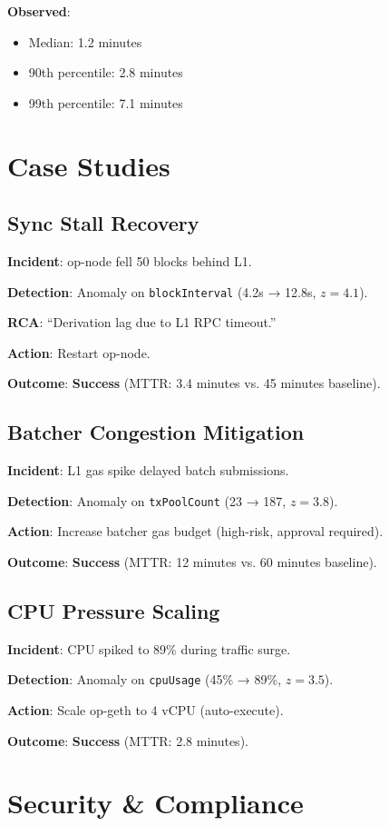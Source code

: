 \documentclass[11pt,a4paper]{article}
\begin{document}
\textbf{Observed}:
\begin{itemize}
    \item Median: 1.2 minutes
    \item 90th percentile: 2.8 minutes
    \item 99th percentile: 7.1 minutes
\end{itemize}

\section{Case Studies}

\subsection{Sync Stall Recovery}
\textbf{Incident}: op-node fell 50 blocks behind L1.

\textbf{Detection}: Anomaly on \texttt{blockInterval} (4.2s → 12.8s, $z=4.1$).

\textbf{RCA}: ``Derivation lag due to L1 RPC timeout.''

\textbf{Action}: Restart op-node.

\textbf{Outcome}: \textbf{Success} (MTTR: 3.4 minutes vs. 45 minutes baseline).

\subsection{Batcher Congestion Mitigation}
\textbf{Incident}: L1 gas spike delayed batch submissions.

\textbf{Detection}: Anomaly on \texttt{txPoolCount} (23 → 187, $z=3.8$).

\textbf{Action}: Increase batcher gas budget (high-risk, approval required).

\textbf{Outcome}: \textbf{Success} (MTTR: 12 minutes vs. 60 minutes baseline).

\subsection{CPU Pressure Scaling}
\textbf{Incident}: CPU spiked to 89\% during traffic surge.

\textbf{Detection}: Anomaly on \texttt{cpuUsage} (45\% → 89\%, $z=3.5$).

\textbf{Action}: Scale op-geth to 4 vCPU (auto-execute).

\textbf{Outcome}: \textbf{Success} (MTTR: 2.8 minutes).

\section{Security \& Compliance}
\end{document}
